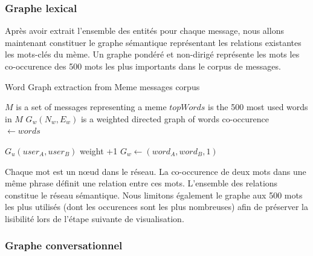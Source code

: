 \subsubsection{Graphe lexical}

    Après avoir extrait l'ensemble des entités pour chaque message, nous allons maintenant constituer le graphe sémantique représentant les relations existantes les mots-clés du mème. Un graphe pondéré et non-dirigé représente les mots les co-occurence des 500 mots les plus importants dans le corpus de messages.

    \begin{algorithm}[h]
        \caption{Word Graph extraction from Meme messages corpus}
        \label{algo:meme-graph}
        \begin{algorithmic}

            \Require $M$ is a set of messages representing a meme
            \State $topWords$ is the 500 most used words in $M$
            \State $G_w(N_w,E_w)$ is a weighted directed graph of words co-occurence
            \\
                    \State {}  $ \gets words$

                                \State $G_u(user_A,user_B)$ weight +1
                            \Else
                                \State $G_w \gets (word_A,word_B, 1)$
                            \EndIf
                        \EndFor
                    \EndIf
                \EndFor
            \EndFunction
        \end{algorithmic}
    \end{algorithm}

    Chaque mot est un nœud dans le réseau. La co-occurence de deux mots dans une même phrase définit une relation entre ces mots. L{\textquoteright}ensemble des relations constitue le réseau sémantique. Nous limitons également le graphe aux 500 mots les plus utilisés (dont les occurences sont les plus nombreuses) afin de préserver la lisibilité lors de l'étape suivante de visualisation.

\subsubsection[Graphe conversationnel]{Graphe conversationnel}

